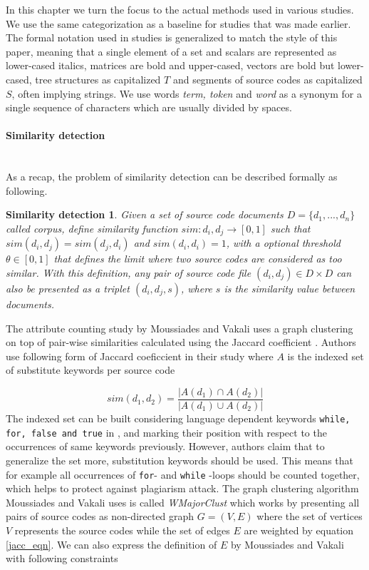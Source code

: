 In this chapter we turn the focus to the actual methods used in various studies. We use the same categorization as a baseline for studies that was made earlier. The formal notation used in studies is generalized to match the style of this paper, meaning that a single element of a set and scalars are represented as lower-cased italics, matrices are bold and upper-cased, vectors are bold but lower-cased, tree structures as capitalized $T$ and segments of source codes as capitalized $S$, often implying strings. We use words \emph{term, token} and \emph{word} as a synonym for a single sequence of characters which are usually divided by spaces.

\paragraph{Similarity detection}\mbox{}\\
As a recap, the problem of similarity detection can be described formally as following.

\newtheorem*{smd}{Similarity detection}

\begin{smd}
Given a set of source code documents $D = \{d_1,...,d_n\}$ called corpus, define similarity function $sim: d_i, d_j \rightarrow [0, 1]$ such that $sim(d_i, d_j) = sim(d_j, d_i)$ and $sim(d_i, d_i) = 1$, with a optional threshold $\theta \in [0, 1]$ that defines the limit where two source codes are considered as too similar. With this definition, any pair of source code file $(d_i, d_j) \in D \times D$ can also be presented as a triplet $(d_i, d_j, s)$, where $s$ is the similarity value between documents. 
\end{smd}

The attribute counting study by Moussiades and Vakali uses a graph clustering on top of pair-wise similarities calculated using the Jaccard coefficient \cite{PACASCD2005}. Authors use following form of Jaccard coeficcient in their study where $A$ is the indexed set of substitute keywords per source code 

\begin{equation}\label{jacc_eqn}
    sim(d_1, d_2) = \dfrac{|A(d_1) \cap A(d_2)|}{|A(d_1) \cup A(d_2)|}
\end{equation}
\noindent
The indexed set can be built considering language dependent keywords \eg \texttt{while, for, false and true} in \cpp, and marking their position with respect to the occurrences of same keywords previously. However, authors claim that to generalize the set more, substitution keywords should be used. This means that for example all occurrences of \texttt{for}- and \texttt{while} -loops should be counted together, which helps to protect against plagiarism attack. The graph clustering algorithm Moussiades and Vakali uses is called \emph{WMajorClust} which works by presenting all pairs of source codes as non-directed graph $G = (V, E)$ where the set of vertices $V$ represents the source codes while the set of edges $E$ are weighted by equation \ref{jacc_eqn}. We can also express the definition of $E$ by Moussiades and Vakali with following constraints

